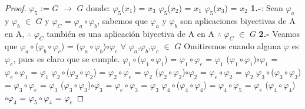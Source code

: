 \documentclass[10pt,a4paper,oneside]{article}
\begin{document}
\begin{proof}
					$\varphi_{5}$ := $G$ $\rightarrow$ $G$ donde:
					\newline
					$\varphi_{5}$($x_{1}$) = $x_{3}$
					\newline
					$\varphi_{5}$($x_{2}$) = $x_{1}$
					\newline
					$\varphi_{5}$($x_{3}$) = $x_{2}$
					\newline
					\newline
					\textbf{1.-}:
					Sean $\varphi_{a}$ y  $\varphi_{b}$ $\in$ $G$ y $\varphi_{C}$ = $\varphi_{a}\circ\varphi_{b}$, sabemos que $\varphi_{a}$ y $\varphi_{b}$ son aplicaciones biyectivas de A en A, $\therefore$ $\varphi_{C}$ también es una aplicación biyectiva de A en A $\therefore$ $\varphi_{C}$ $\in$ $G$
					\newline
					\newline
					\textbf{2.-}
					Veamos que $\varphi_{a}\circ$($\varphi_{b}\circ\varphi_{c}$) = ($\varphi_{a}\circ\varphi_{b}$)$\circ\varphi_{c}$ $\forall$ $\varphi_{a}$,$\varphi_{b}$,$\varphi_{c}$ $\in$ $G$
					\newline
					Omitiremos cuando alguna $\varphi$ es $\varphi_{e}$, pues es claro que se cumple.
					\newline
					$\varphi_{1}\circ$($\varphi_{1}\circ\varphi_{1}$) = $\varphi_{1}\circ\varphi_{e}$ = $\varphi_{1}$
					\newline
					($\varphi_{1}\circ\varphi_{1}$)$\circ\varphi_{1}$ = $\varphi_{e}\circ\varphi_{1}$ = $\varphi_{1}$
					\newline
					\newline
					$\varphi_{2}\circ$($\varphi_{2}\circ\varphi_{2}$) = $\varphi_{2}\circ\varphi_{e}$ = $\varphi_{2}$
					\newline
					($\varphi_{2}\circ\varphi_{2}$)$\circ\varphi_{2}$ = $\varphi_{e}\circ\varphi_{2}$ = $\varphi_{2}$
					\newline
					\newline
					$\varphi_{3}\circ$($\varphi_{3}\circ\varphi_{3}$) = $\varphi_{3}\circ\varphi_{e}$ = $\varphi_{3}$
					\newline
					($\varphi_{3}\circ\varphi_{3}$)$\circ\varphi_{3}$ = $\varphi_{e}\circ\varphi_{3}$ = $\varphi_{3}$
					\newline
					\newline
					$\varphi_{4}\circ$($\varphi_{4}\circ\varphi_{4}$) = $\varphi_{4}\circ\varphi_{5}$ = $\varphi_{e}$
					\newline
					($\varphi_{4}\circ\varphi_{4}$)$\circ\varphi_{4}$ = $\varphi_{5}\circ\varphi_{4}$ = $\varphi_{e}$

\end{proof}
\end{document}
